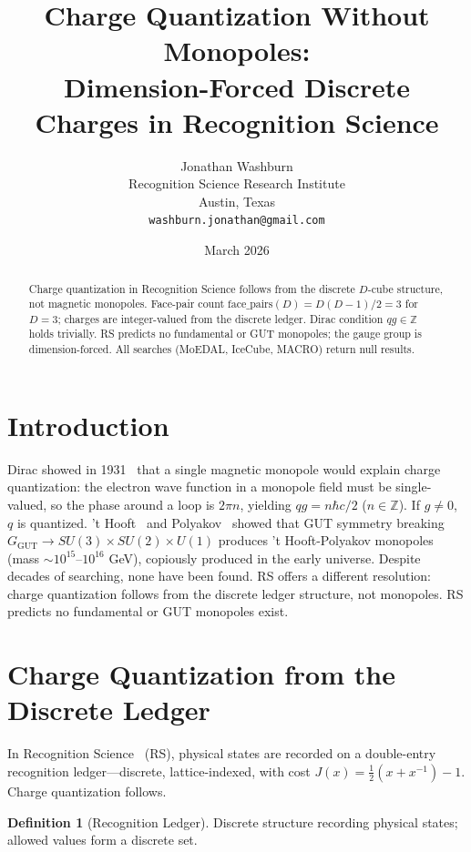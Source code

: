 \documentclass[12pt,a4paper]{article}
\title{Charge Quantization Without Monopoles:\\
Dimension-Forced Discrete Charges in Recognition Science}
\author{Jonathan Washburn\\
Recognition Science Research Institute\\
Austin, Texas\\
\texttt{washburn.jonathan@gmail.com}}
\date{March 2026}
\theoremstyle{definition}
\newtheorem{definition}[theorem]{Definition}
\theoremstyle{remark}
\begin{document}
\maketitle

\begin{abstract}
Charge quantization in Recognition Science follows from the discrete
$D$-cube structure, not magnetic monopoles.  Face-pair count
$\mathrm{face\_pairs}(D) = D(D-1)/2 = 3$ for $D = 3$; charges are
integer-valued from the discrete ledger.  Dirac condition $qg \in
\mathbb{Z}$ holds trivially.  RS predicts no fundamental or GUT
monopoles; the gauge group is dimension-forced.  All searches (MoEDAL,
IceCube, MACRO) return null results.
\end{abstract}

\section{Introduction}
\label{sec:intro}

Dirac showed in 1931~\cite{Dirac1931} that a single magnetic monopole
would explain charge quantization: the electron wave function in a
monopole field must be single-valued, so the phase around a loop is
$2\pi n$, yielding $qg = n\hbar c/2$ ($n \in \mathbb{Z}$).  If $g \neq
0$, $q$ is quantized.  't Hooft~\cite{tHooft1974} and
Polyakov~\cite{Polyakov1974} showed that GUT symmetry breaking
$G_{\mathrm{GUT}} \to SU(3) \times SU(2) \times U(1)$ produces
't Hooft-Polyakov monopoles (mass $\sim 10^{15}$--$10^{16}$ GeV),
copiously produced in the early universe.  Despite decades of
searching, none have been found.  RS offers a different resolution:
charge quantization follows from the discrete ledger structure, not
monopoles.  RS predicts no fundamental or GUT monopoles exist.

\section{Charge Quantization from the Discrete Ledger}
\label{sec:charge-quantization}

In Recognition Science~\cite{RS_Axioms} (RS), physical states are
recorded on a double-entry recognition ledger---discrete,
lattice-indexed, with cost $J(x) = \tfrac{1}{2}(x + x^{-1}) - 1$.
Charge quantization follows.

\begin{definition}[Recognition Ledger]
Discrete structure recording physical states; allowed values form a
discrete set.
\end{definition}
\end{document}
